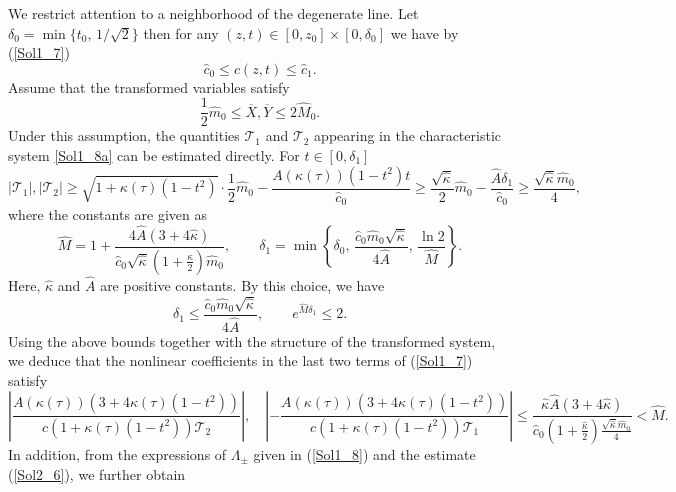 \documentclass[3p,11pt]{elsarticle}
\numberwithin{equation}{section}
\begin{document}
We restrict attention to a neighborhood of the degenerate line. Let $\delta_0 = \min\{t_0,\, 1/\sqrt{2}\}$ then for any $(z,t) \in [0,z_0] \times [0,\delta_0]$ we have by (\ref{Sol1_7}) 
\begin{equation*}\label{Sol2_1}
\hat{c}_0 \leq c(z,t) \leq \hat{c}_1.
\end{equation*}
Assume that the transformed variables satisfy
\begin{equation}\label{Sol2_4}
\frac{1}{2}\hat{m}_0 \leq \overline{X},\overline{ Y} \leq 2\hat{M}_0.
\end{equation}
Under this assumption, the quantities $\mathcal{T}_1$ and $\mathcal{T}_2$  appearing in the characteristic system \eqref{Sol1_8a} can be estimated directly. For $t \in [0,\delta_1]$
\begin{equation*}\label{Sol2_5}
|\mathcal{T}_1|,|\mathcal{T}_2| \geq \sqrt{1+\kappa(\tau)(1-t^2)}\cdot \frac{1}{2}\hat{m}_0 - \frac{A(\kappa(\tau))(1-t^2)t}{\hat{c}_0} 
\geq \frac{\sqrt{\hat\kappa}}{2}\hat{m}_0 - \frac{\hat A\delta_1}{\hat{c}_0} \geq \frac{\sqrt{\hat\kappa}\hat{m}_0}{4},
\end{equation*}
where the constants are given as
\begin{equation*}\label{Sol2_2}
\hat{M} = 1 + \frac{4\hat A(3+4\hat\kappa)}{\hat{c}_0\sqrt{\hat\kappa}(1+\frac{\hat\kappa}{2})\hat{m}_0}, 
\qquad 
\delta_1 = \min\left\{\delta_0,\, \frac{\hat{c}_0\hat{m}_0\sqrt{\hat\kappa}}{4\hat A},\, \frac{\ln 2}{\hat{M}}\right\}.
\end{equation*}
Here, $\hat \kappa$ and $\hat A$ are positive constants. By this choice, we have  
\begin{equation*}\label{Sol2_3}
\delta_1 \leq \frac{\hat{c}_0\hat{m}_0\sqrt{\hat\kappa}}{4\hat A}, 
\qquad 
e^{\hat{M}\delta_1} \leq 2.
\end{equation*}
Using the above bounds together with the structure of the transformed system, we deduce that the nonlinear coefficients in the last two terms of (\ref{Sol1_7}) satisfy 
\begin{equation}\label{Sol2_6}
\left|\frac{A(\kappa(\tau))(3+4\kappa(\tau)(1-t^2))}{c(1+\kappa(\tau)(1-t^2))\mathcal{T}_2}\right|, 
\quad \left|-\frac{A(\kappa(\tau))(3+4\kappa(\tau)(1-t^2))}{c(1+\kappa(\tau)(1-t^2))\mathcal{T}_1}\right| 
\leq \frac{\hat\kappa\hat A(3+4\hat\kappa)}{\hat{c}_0(1+\tfrac{\hat\kappa}{2})\tfrac{\sqrt{\hat\kappa}\hat{m}_0}{4}} 
< \hat{M}.
\end{equation}
In addition, from the expressions of $\Lambda_{\pm}$ given in (\ref{Sol1_8}) and the estimate (\ref{Sol2_6}), we further obtain
\end{document}
